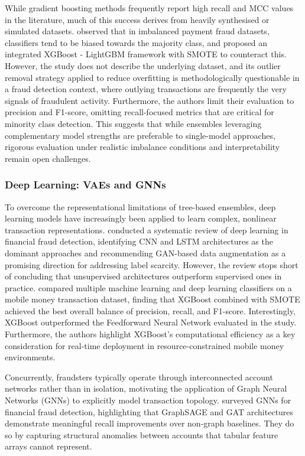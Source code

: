\documentclass[a4paper,fleqn]{cas-sc}
\begin{document}
While gradient boosting methods frequently report high recall and MCC values in the literature, much of this success derives from heavily synthesised or simulated datasets. \cite{zheng2024advanced1} observed that in imbalanced payment fraud datasets, classifiers tend to be biased towards the majority class, and proposed an integrated XGBoost - LightGBM framework with SMOTE to counteract this. However, the study does not describe the underlying dataset, and its outlier removal strategy applied to reduce overfitting is methodologically questionable in a fraud detection context, where outlying transactions are frequently the very signals of fraudulent activity. Furthermore, the authors limit their evaluation to precision and F1-score, omitting recall-focused metrics that are critical for minority class detection. This suggests that while ensembles leveraging complementary model strengths are preferable to single-model approaches, rigorous evaluation under realistic imbalance conditions and interpretability remain open challenges.

\subsubsection{Deep Learning: VAEs and GNNs}
To overcome the representational limitations of tree-based ensembles, deep learning models have increasingly been applied to learn complex, nonlinear transaction representations. \cite{Chen2025DeepLearning} conducted a systematic review of deep learning in financial fraud detection, identifying CNN and LSTM architectures as the dominant approaches and recommending GAN-based data augmentation as a promising direction for addressing label scarcity. However, the review stops short of concluding that unsupervised architectures outperform supervised ones in practice. \cite{Hanbali2025MobileMoneyFraud} compared multiple machine learning and deep learning classifiers on a mobile money transaction dataset, finding that XGBoost combined with SMOTE achieved the best overall balance of precision, recall, and F1-score. Interestingly, XGBoost outperformed the Feedforward Neural Network evaluated in the study. Furthermore, the authors highlight XGBoost's computational efficiency as a key consideration for real-time deployment in resource-constrained mobile money environments.

Concurrently, fraudsters typically operate through interconnected account networks rather than in isolation, motivating the application of Graph Neural Networks (GNNs) to explicitly model transaction topology. \cite{cheng2025graph} surveyed GNNs for financial fraud detection, highlighting that GraphSAGE and GAT architectures demonstrate meaningful recall improvements over non-graph baselines. They do so by capturing structural anomalies between accounts that tabular feature arrays cannot represent.
\end{document}
